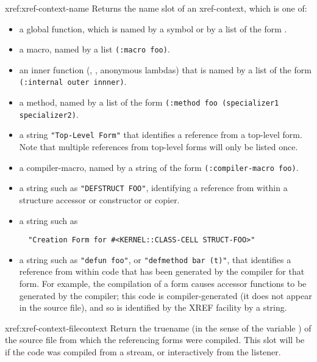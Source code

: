 \begin{defun}{xref:}{xref-context-name}{\args {}}
  Returns the name slot of an xref-context, which is one of:
\begin{itemize}
\item
a global function, which is named by a symbol or by a list of the form
. 

\item
a macro, named by a list \verb|(:macro foo)|.

\item
an inner function (, , anonymous lambdas) that
is named by a list of the form \verb|(:internal outer innner)|.

\item
a method, named by a list of the form
\verb|(:method foo (specializer1 specializer2)|. 

\item
a string \verb|"Top-Level Form"| that identifies a reference from a
top-level form. Note that multiple references from top-level forms
will only be listed once. 

\item
a compiler-macro, named by a string of the form
\verb|(:compiler-macro foo)|. 

\item
a string such as \verb|"DEFSTRUCT FOO"|, identifying a reference from
within a structure accessor or constructor or copier.

\item
a string such as 
\begin{verbatim}
  "Creation Form for #<KERNEL::CLASS-CELL STRUCT-FOO>"
\end{verbatim}

\item
a string such as \verb|"defun foo"|, or \verb|"defmethod bar (t)"|,
that identifies a reference from within code that has been generated
by the compiler for that form. For example, the compilation of a
 form causes accessor functions to be generated by the
compiler; this code is compiler-generated (it does not appear in the
source file), and so is identified by the XREF facility by a string. 
\end{itemize}
\end{defun}


\begin{defun}{xref:}{xref-context-file}{context}
  Return the truename (in the sense of the variable
   ) of the source file from which the
   referencing forms were compiled. This slot will be \nil{} if the
   code was compiled from a stream, or interactively from the
   listener.
\end{defun}

